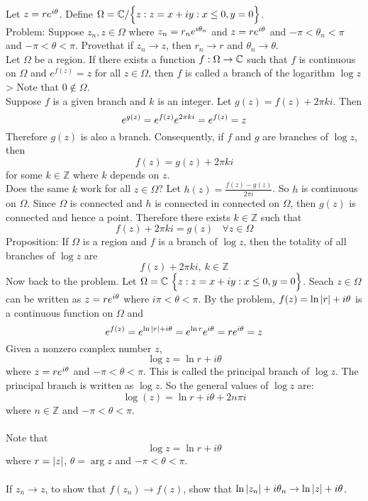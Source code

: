 \documentclass[12pt]{article}
\begin{document}
Let $z = re^{i\theta}$. Define $\Omega = \mathbb{C} / \Big\{ z: z = x+iy: x \leq 0, y = 0 \Big\}$. \\
Problem: Suppose $z_n,z \in \Omega$ where $z_n = r_ne^{i\theta_n}$ and $z = re^{i\theta}$ and $-\pi < \theta_n < \pi$ and $-\pi < \theta < \pi$. Provethat if $z_n \to z$, then $r_n \to r$ and $\theta_n \to \theta$. \\
Let $\Omega$ be a region. If there exists a function $f: \Omega \to \mathbb{C}$ such that $f$ is continuous on $\Omega$ and $e^{f(z)} = z$ for all $ z \in \Omega$, then $f$ is called a branch of the logarithm $\log z$> Note that $0 \notin \Omega$. \\
Suppose $f$ is a given branch and $k$ is an integer. Let $g(z) = f(z) + 2\pi ki$. Then $$e^{g(z)} = e^{f(z)}e^{2\pi ki} = e^{f(z)} = z $$ Therefore $g(z)$ is also a branch. Consequently, if $f$ and $g$ are branches of $\log z$, then $$f(z) = g(z) + 2\pi ki$$ for some $k \in \mathbb{Z}$ where $k$ depends on $z$. \\
Does the same $k$ work for all $z \in \Omega$? Let $h(z) = \frac{f(z) - g(z)}{2\pi i} $. So $h$ is continuous on $\Omega$. Since $\Omega$ is connected and $h$ is connected in connected on $\Omega$, then $g(z)$ is connected and hence a point. Therefore there exists $k \in \mathbb{Z}$ such that $$f(z) + 2\pi ki = g(z) ~~~~ \forall z \in \Omega$$ 
Proposition: If $\Omega$ is a region and $f$ is a branch of $\log z$, then the totality of all branches of $\log z$ are $$f(z) + 2\pi ki, ~ k \in \mathbb{Z}$$ 
Now back to the problem. Let $\Omega = \mathbb{C} \ \Big\{ z: z = x+iy: x \leq 0, y = 0 \Big\}$. Seach $z \in \Omega$ can be written as $z = re^{i\theta}$ where $i\pi < \theta < \pi$. By the problem, $f(z) = \ln \abs{r} + i\theta$ is a continuous function on $\Omega$ and $$e^{f(z)} = e^{\ln\abs{r} + i\theta} = e^{\ln r} e^{i\theta} = re^{i\theta} = z$$ 
Given a nonzero complex number $z$, $$\log z = \ln r + i\theta $$ where $z = re^{i\theta}$ and $-\pi < \theta < \pi$. This is called the principal branch of $\log z$. The principal branch is written as $\log z$. So the general values of $\log z$ are: $$\log(z) = \ln r + i\theta + 2n\pi i $$ where $n \in \mathbb{Z}$ and $-\pi < \theta < \pi$. \\~\\
Note that $$ \log z = \ln r + i\theta $$ where $r = \abs{z}$, $\theta = \arg z$ and $-\pi < \theta < \pi$. \\~\\
If $z_n \to z$, to show that $f(z_n) \to f(z)$, show that $\ln \abs{z_n} + i\theta_ n \to \ln \abs{z} + i\theta$. \\~\\
\end{document}
